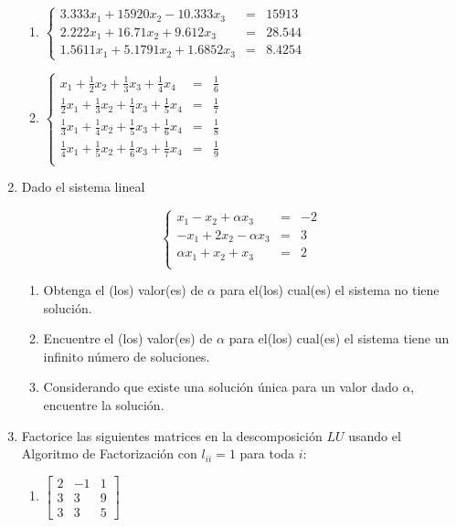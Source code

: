 \documentclass[12pt,letterpaper]{article}
\theoremstyle{plain}
\begin{document}
\begin{enumerate}
\begin{multicols}{2}
\begin{enumerate}
\item $\left\{\begin{array}{ccc}
        3.333x_1+15920x_2-10.333x_3&=&15913\\
        2.222x_1+16.71x_2+9.612x_3&=&28.544\\
        1.5611x_1+5.1791x_2+1.6852x_3&=&8.4254
       \end{array}\right.$

\item $\left\{\begin{array}{ccc}
        x_1+\frac{1}{2}x_2+\frac{1}{3}x_3+\frac{1}{4}x_4&=&\frac{1}{6}\\
        \frac{1}{2}x_1+\frac{1}{3}x_2+\frac{1}{4}x_3+\frac{1}{5}x_4&=&\frac{1}{7}\\
        \frac{1}{3}x_1+\frac{1}{4}x_2+\frac{1}{5}x_3+\frac{1}{6}x_4&=&\frac{1}{8}\\
        \frac{1}{4}x_1+\frac{1}{5}x_2+\frac{1}{6}x_3+\frac{1}{7}x_4&=&\frac{1}{9}\\
       \end{array}\right.$
\end{enumerate}
\end{multicols}
\item Dado el sistema lineal

$$
\left\{\begin{array}{ccc}
 x_1-x_2+\alpha x_3&=&-2\\
 -x_1+2x_2-\alpha x_3&=&3\\
 \alpha x_1+x_2+x_3&=&2\\
\end{array}\right.
$$

\begin{enumerate}
 \item Obtenga el (los) valor(es) de $\alpha$ para el(los) cual(es) el sistema no tiene soluci\'on.
 \item Encuentre el (los) valor(es) de $\alpha$ para el(los) cual(es) el sistema tiene un infinito n\'umero de soluciones.
 \item Considerando que existe una soluci\'on \'unica para un valor dado $\alpha$, encuentre la soluci\'on.
\end{enumerate}

\item Factorice las siguientes matrices en la descomposici\'on $LU$ usando el Algoritmo de Factorizaci\'on con $l_{ii}=1$ para toda $i$:
\begin{multicols}{2}
\begin{enumerate}
 \item $\left[ \begin{array}{ccc}
         2&-1&1\\
         3&3&9\\
         3&3&5
        \end{array}\right]
$


\end{enumerate}
\end{multicols}
\end{enumerate}
\end{document}
